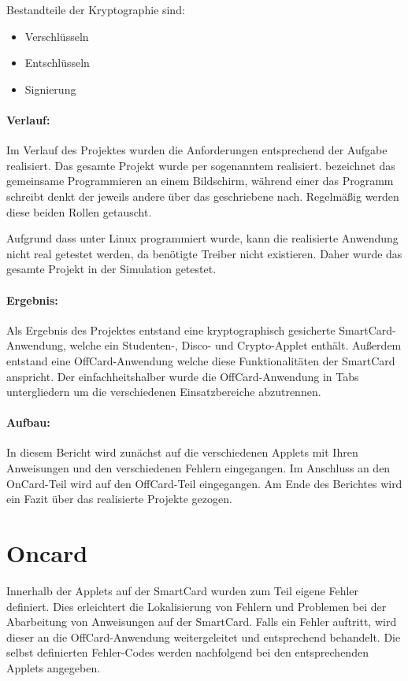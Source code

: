 Bestandteile der Kryptographie sind:
\begin{itemize}
	\item Verschlüsseln
	\item Entschlüsseln
	\item Signierung
\end{itemize}

\paragraph{Verlauf:}
Im Verlauf des Projektes wurden die Anforderungen entsprechend der Aufgabe realisiert.
Das gesamte Projekt wurde per sogenanntem  realisiert.
 bezeichnet das gemeinsame Programmieren an einem Bildschirm, während einer das Programm schreibt denkt der jeweils andere über das geschriebene nach.
Regelmäßig werden diese beiden Rollen getauscht.

Aufgrund dass unter Linux programmiert wurde, kann die realisierte Anwendung nicht real getestet werden, da benötigte Treiber nicht existieren.
Daher wurde das gesamte Projekt in der Simulation getestet.

\paragraph{Ergebnis:}
Als Ergebnis des Projektes entstand eine kryptographisch gesicherte SmartCard-Anwendung, welche ein Studenten-, Disco- und Crypto-Applet enthält.
Außerdem entstand eine OffCard-Anwendung welche diese Funktionalitäten der SmartCard anspricht.
Der einfachheitshalber wurde die OffCard-Anwendung in Tabs untergliedern um die verschiedenen Einsatzbereiche abzutrennen.

\paragraph{Aufbau:}
In diesem Bericht wird zunächst auf die verschiedenen Applets mit Ihren Anweisungen und den verschiedenen Fehlern eingegangen.
Im Anschluss an den OnCard-Teil wird auf den OffCard-Teil eingegangen.
Am Ende des Berichtes wird ein Fazit über das realisierte Projekte gezogen.

\section{Oncard}
Innerhalb der Applets auf der SmartCard wurden zum Teil eigene Fehler definiert.
Dies erleichtert die Lokalisierung von Fehlern und Problemen bei der Abarbeitung von Anweisungen auf der SmartCard.
Falls ein Fehler auftritt, wird dieser an die OffCard-Anwendung weitergeleitet und entsprechend behandelt.
Die selbst definierten Fehler-Codes werden nachfolgend bei den entsprechenden Applets angegeben.

